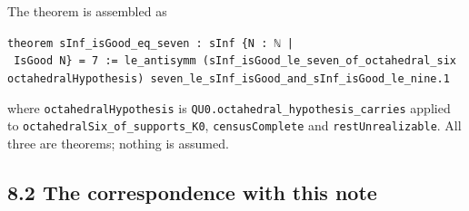 \documentclass[11pt,a4paper]{article}
\theoremstyle{named}
\begin{document}
The theorem is assembled as

\begin{leancode}
\item \texttt{theorem\ \allowbreak{}sInf\_\allowbreak{}isGood\_\allowbreak{}eq\_\allowbreak{}seven\ \allowbreak{}:\ \allowbreak{}sInf\ \allowbreak{}\{N\ \allowbreak{}:\ \allowbreak{}ℕ\ \allowbreak{}|\ \allowbreak{}IsGood\ \allowbreak{}N\}\ \allowbreak{}=\ \allowbreak{}7\ \allowbreak{}:=\ \allowbreak{}le\_\allowbreak{}antisymm\ \allowbreak{}(sInf\_\allowbreak{}isGood\_\allowbreak{}le\_\allowbreak{}seven\_\allowbreak{}of\_\allowbreak{}octahedral\_\allowbreak{}six\ \allowbreak{}octahedralHypothesis)\ \allowbreak{}seven\_\allowbreak{}le\_\allowbreak{}sInf\_\allowbreak{}isGood\_\allowbreak{}and\_\allowbreak{}sInf\_\allowbreak{}isGood\_\allowbreak{}le\_\allowbreak{}nine.\allowbreak{}1}
\end{leancode}

where \texttt{octahedralHypothesis} is \texttt{QU0.\allowbreak{}octahedral\_\allowbreak{}hypothesis\_\allowbreak{}carries} applied to \texttt{octahedralSix\_\allowbreak{}of\_\allowbreak{}supports\_\allowbreak{}K0}, \texttt{censusComplete} and \texttt{restUnrealizable}. All three are theorems; nothing is assumed.

\subsection*{8.2 The correspondence with this note}
\end{document}
